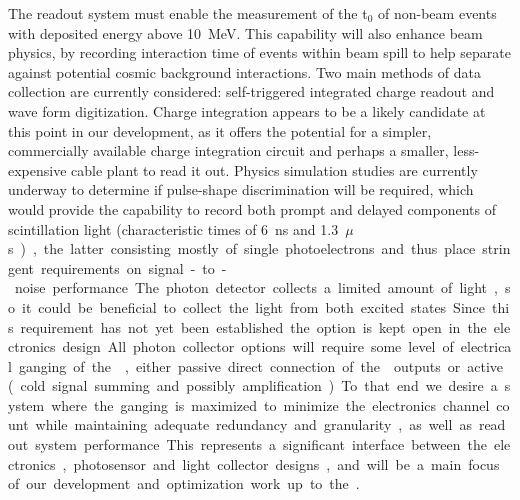 The readout system must enable the measurement of the t$_0$ of non-beam events with deposited energy above \SI{10}{MeV}. 
This capability will also enhance beam physics, by recording interaction time of events within 
beam spill to help separate against potential cosmic background interactions. Two main methods of data collection are currently considered:  self-triggered integrated charge readout and wave form digitization.  Charge integration appears to be a likely candidate at this point in our development, as it offers the potential for a simpler, commercially available charge integration circuit and perhaps a smaller, less-expensive cable plant to read it out.  Physics simulation studies are currently underway to determine if pulse-shape discrimination will be required, which would provide the capability to record both prompt and delayed components of scintillation light (characteristic times of \SI{6}{ns} and \SI{1.3}{$\mu$s}), the latter consisting mostly of single photoelectrons and thus place stringent requirements on signal-to-noise performance. The photon detector collects a limited amount of light, so it could be beneficial to collect the light from both excited states. 
Since this requirement has not yet been established the option is kept open in the electronics design.

All photon collector options will require some level of electrical ganging of the , either passive direct connection of the  outputs or active (cold signal summing and possibly amplification).  To that end we desire a system where the ganging is maximized to minimize the electronics channel count while maintaining adequate redundancy and granularity, as well as readout system performance.  This represents a significant interface between the electronics, photosensor and light collector designs, and will be a main focus of our development and optimization work up to the .

